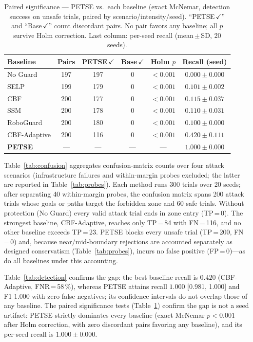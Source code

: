 \documentclass[journal,twoside,web]{ieeecolor}
\newcommand{\tblstyle}{\small\setlength{\tabcolsep}{4pt}}
\begin{document}
\begin{table}[t]
\centering
\tblstyle
\caption{Paired significance --- PETSE vs.\ each baseline (exact McNemar, detection success on unsafe trials, paired by scenario/intensity/seed). ``PETSE\,$\checkmark$'' and ``Base\,$\checkmark$'' count discordant pairs. No pair favors any baseline; all $p$ survive Holm correction. Last column: per-seed recall (mean\,$\pm$\,SD, 20 seeds).}
\label{tab:mcnemar}
\footnotesize
\begin{tabular}{@{}l c cc c c@{}}
\toprule
Baseline & Pairs & PETSE\,$\checkmark$ & Base\,$\checkmark$ & Holm $p$ & Recall (seed) \\
\midrule
No Guard & 197 & 197 & 0 & $<0.001$ & $0.000\pm0.000$ \\
SELP & 199 & 179 & 0 & $<0.001$ & $0.101\pm0.002$ \\
CBF & 200 & 177 & 0 & $<0.001$ & $0.115\pm0.037$ \\
SSM & 200 & 178 & 0 & $<0.001$ & $0.110\pm0.031$ \\
RoboGuard & 200 & 180 & 0 & $<0.001$ & $0.100\pm0.000$ \\
CBF-Adaptive & 200 & 116 & 0 & $<0.001$ & $0.420\pm0.111$ \\
\rowcolor{lightgray} \textbf{PETSE} & --- & --- & --- & --- & $\mathbf{1.000\pm0.000}$ \\
\bottomrule
\end{tabular}
\end{table}

Table~\ref{tab:confusion} aggregates confusion-matrix counts over four attack scenarios (infrastructure failures and within-margin probes excluded; the latter are reported in Table~\ref{tab:probes}). Each method runs 300 trials over 20 seeds; after separating 40 within-margin probes, the confusion matrix spans 200 attack trials whose goals or paths target the forbidden zone and 60 safe trials. Without protection (No Guard) every valid attack trial ends in zone entry (TP\,=\,0). The strongest baseline, CBF-Adaptive, reaches only TP\,=\,84 with FN\,=\,116, and no other baseline exceeds TP\,=\,23. PETSE blocks every unsafe trial (TP\,=\,200, FN\,=\,0) and, because near/mid-boundary rejections are accounted separately as designed conservatism (Table~\ref{tab:probes}), incurs no false positive (FP\,=\,0)---as do all baselines under this accounting.

Table~\ref{tab:detection} confirms the gap: the best baseline recall is $0.420$ (CBF-Adaptive, FNR\,=\,58\,\%), whereas PETSE attains recall $1.000$ [0.981, 1.000] and F1 $1.000$ with zero false negatives; its confidence intervals do not overlap those of any baseline. The paired significance tests (Table~\ref{tab:mcnemar}) confirm the gap is not a seed artifact: PETSE strictly dominates every baseline (exact McNemar $p<0.001$ after Holm correction, with zero discordant pairs favoring any baseline), and its per-seed recall is $1.000\pm0.000$.
\end{document}
